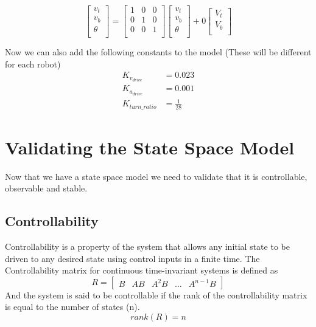 \documentclass{scrartcl}
\begin{document}
\begin{equation}
    \begin{bmatrix}
        v_t    \\
        v_b    \\
        \theta \\
    \end{bmatrix}      = \begin{bmatrix}
        1 & 0 & 0 \\
        0 & 1 & 0 \\
        0 & 0 & 1 \\
    \end{bmatrix}\begin{bmatrix}
        v_t    \\
        v_b    \\
        \theta \\
    \end{bmatrix} + 0\begin{bmatrix}
        V_t \\
        V_b \\
    \end{bmatrix}
\end{equation}

Now we can also add the following constants to the model (These will be different for each robot)
\begin{align}
    K_{v_\mathit{drive}}   & = 0.023        \\
    K_{a_\mathit{drive}}   & = 0.001        \\
    K_\mathit{turn\_ratio} & = \frac{1}{28}
\end{align}

\newpage

\section{Validating the State Space Model}
Now that we have a state space model we need to validate that it is controllable, observable and stable.
\subsection{Controllability}
Controllability is a property of the system that allows any initial state to be driven to any desired state using control inputs in a finite time.
The Controllability matrix for continuous time-invariant systems is defined as
\begin{equation}
    \mathit{R} = \begin{bmatrix}
        B & AB & A^2B & \dots & A^{n-1}B
    \end{bmatrix}
\end{equation}
And the system is said to be controllable if the rank of the controllability matrix is equal to the number of states (n).
\begin{equation}
    \mathit{rank}(\mathit{R}) = n
\end{equation}
\end{document}
